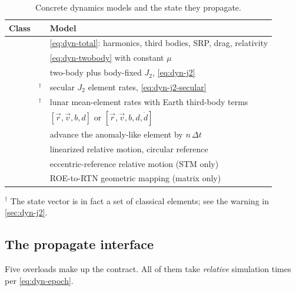 \begin{table}[H]
  \centering
  \caption{Concrete dynamics models and the state they propagate.}
  \label{tab:dyn-classes}
  \begin{tabularx}{\textwidth}{llL}
    \toprule
    Class &  & Model \\
    \midrule
     &  & \cref{eq:dyn-total}: harmonics, third bodies, SRP, drag, relativity \\
     &  & \cref{eq:dyn-twobody} with constant $\mu$ \\
     &  & two-body plus body-fixed $J_2$, \cref{eq:dyn-j2} \\
     & $^{\dagger}$ & secular $J_2$ element rates, \cref{eq:dyn-j2-secular} \\
     & $^{\dagger}$ & lunar mean-element rates with Earth third-body terms \\
     &  & $[\vec{r},\vec{v},b,d]$ or $[\vec{r},\vec{v},b,d,\dot{d}]$ \\
     &  & advance the anomaly-like element by $n\,\Delta t$ \\
     &  & linearized relative motion, circular reference \\
     &  & eccentric-reference relative motion (STM only) \\
     &  & ROE-to-RTN geometric mapping (matrix only) \\
    \bottomrule
  \end{tabularx}

  \vspace{2pt}
  {\small $^{\dagger}$ The state vector is in fact a set of classical elements;
  see the warning in \cref{sec:dyn-j2}.}
\end{table}

\subsection{The propagate interface}

Five overloads make up the contract. All of them take \emph{relative} simulation
times per \cref{eq:dyn-epoch}.


